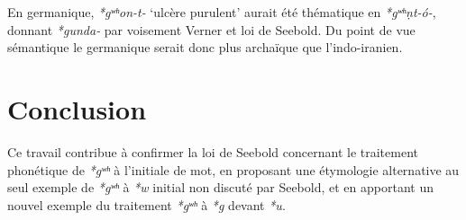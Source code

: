 \documentclass[11pt]{article}
\newcommand{\ipa}[1]{{\phon\textit{#1}}}
\begin{document}
En germanique, \ipa{*gʷʰon-t-} `ulcère purulent' aurait été thématique en \ipa{*gʷʰṇt-ó-}, donnant \ipa{*gunda-} par voisement Verner et loi de Seebold. Du point de vue sémantique le germanique serait donc plus archaïque que l'indo-iranien.

\section{Conclusion}
Ce travail contribue à confirmer la loi de Seebold concernant le traitement phonétique de \ipa{*gʷʰ} à l'initiale de mot, en proposant une étymologie alternative au seul exemple de \ipa{*gʷʰ} à \ipa{*w} initial non discuté par Seebold, et en apportant un nouvel exemple du traitement \ipa{*gʷʰ} à \ipa{*g} devant \ipa{*u}.





 
\end{document}
